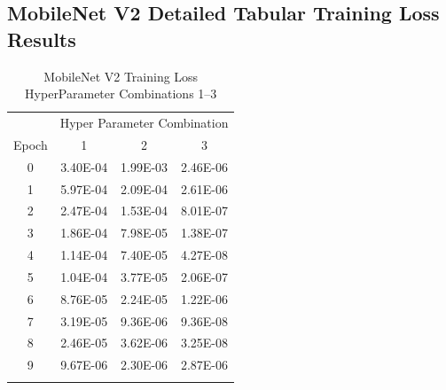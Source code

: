 \documentclass[10pt, conference]{IEEEtran}
\begin{document}


\subsection{MobileNet V2 Detailed Tabular Training Loss Results} %

\begin{table}[H]
    \centering
    \begin{tabular}{@{}cccc@{}}
        \toprule
        & \multicolumn{3}{c}{Hyper Parameter Combination} \\
        \cmidrule{2-4}
            Epoch  & 1 & 2 & 3\\
        \midrule

        0 & 3.40E-04 & 1.99E-03 & 2.46E-06 \\
        1 & 5.97E-04 & 2.09E-04 & 2.61E-06 \\
        2 & 2.47E-04 & 1.53E-04 & 8.01E-07 \\
        3 & 1.86E-04 & 7.98E-05 & 1.38E-07 \\
        4 & 1.14E-04 & 7.40E-05 & 4.27E-08 \\
        5 & 1.04E-04 & 3.77E-05 & 2.06E-07 \\
        6 & 8.76E-05 & 2.24E-05 & 1.22E-06 \\
        7 & 3.19E-05 & 9.36E-06 & 9.36E-08 \\
        8 & 2.46E-05 & 3.62E-06 & 3.25E-08 \\
        9 & 9.67E-06 & 2.30E-06 & 2.87E-06 \\

        \bottomrule\smallskip
    \end{tabular}
    \caption{MobileNet V2 Training Loss HyperParameter Combinations 1--3}%
    \label{table:MobileNetV2TrainingLoss1-3}
\end{table}
\end{document}
